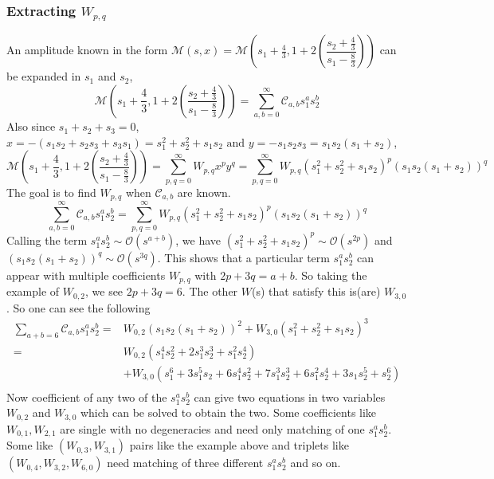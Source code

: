 ﻿\documentclass[12pt,a4paper]{article}
\begin{document}
\subsubsection{Extracting $W_{p,q}$}
An amplitude known in the form $\mathcal{M}(s,x)=\mathcal{M}\left(s_{1}+\frac{4}{3},1+2\left(\dfrac{s_{2}+\frac{4}{3}}{s_{1}-\frac{8}{3}}\right)\right)$ can be expanded in $s_{1}$ and $s_{2}$,
$$
\mathcal{M}\left(s_{1}+\frac{4}{3},1+2\left(\dfrac{s_{2}+\frac{4}{3}}{s_{1}-\frac{8}{3}}\right)\right)=\sum_{a,b=0}^{\infty} \mathcal{C}_{a,b} s_{1}^{a} s_{2}^{b}
$$
Also since $ s_{1} +s_{2} + s_{3}=0$, $x=-\left( s_{1} s_{2} + s_{2} s_{3} + s_{3} s_{1} \right)=s_{1}^{2}+s_{2}^{2}+s_{1}s_{2} \text{ and } y=-s_{1} s_{2}s_{3}=s_{1}s_{2}(s_{1}+s_{2})$, 
$$
\mathcal{M}\left(s_{1}+\frac{4}{3},1+2\left(\dfrac{s_{2}+\frac{4}{3}}{s_{1}-\frac{8}{3}}\right)\right)=\sum_{p,q=0}^{\infty} W_{p, q} x^{p} y^{q}=\sum_{p,q=0}^{\infty} W_{p, q} \left(s_{1}^{2}+s_{2}^{2}+s_{1}s_{2}\right)^{p} \left(s_{1}s_{2}(s_{1}+s_{2}) \right)^{q}
$$
The goal is to find $W_{p, q}$ when $\mathcal{C}_{a,b}$ are known.
$$
\sum_{a,b=0}^{\infty} \mathcal{C}_{a,b} s_{1}^{a} s_{2}^{b}=\sum_{p,q=0}^{\infty} W_{p, q} \left(s_{1}^{2}+s_{2}^{2}+s_{1}s_{2}\right)^{p} \left(s_{1}s_{2}(s_{1}+s_{2}) \right)^{q}
$$
Calling the term $s_{1}^{a}s_{2}^{b}\sim \mathcal{O}(s^{a+b})$, we have $\left(s_{1}^{2}+s_{2}^{2}+s_{1}s_{2}\right)^{p}\sim \mathcal{O}(s^{2p})$ and $ \left(s_{1}s_{2}(s_{1}+s_{2}) \right)^{q} \sim \mathcal{O}(s^{3q})$. This shows that a particular term $s_{1}^{a}s_{2}^{b}$ can appear with multiple coefficients $W_{p, q}$ with $2p+3q=a+b$. So taking the example of $W_{0,2}$, we see $2p+3q=6$. The other $W$(s) that satisfy this is(are) $W_{3,0}$. So one can see the following
$$\begin{aligned}
\sum_{a+b=6} \mathcal{C}_{a,b} s_{1}^{a} s_{2}^{b}=&W_{0, 2}  \left(s_{1}s_{2}(s_{1}+s_{2}) \right)^{2}+W_{3,0} \left(s_{1}^{2}+s_{2}^{2}+s_{1}s_{2}\right)^{3} \\
=&W_{0, 2}  \left(s_{1}^{4} s_{2}^{2}+2 s_{1}^{3} s_{2}^{3}+s_{1}^{2} s_{2}^{4}\right)\\
&+W_{3,0} \left(s_{1}^6 + 3 s_{1}^5 s_{2} + 6 s_{1}^4 s_{2}^2 + 7 s_{1}^3 s_{2}^3 + 6 s_{1}^2 s_{2}^4 +  3 s_{1} s_{2}^5 + s_{2}^6\right) \\
\end{aligned}
$$
Now coefficient of any two of the $s_{1}^{a} s_{2}^{b}$ can give two equations in two variables $W_{0, 2}$ and $W_{3,0}$ which can be solved to obtain the two. Some coefficients like $W_{0, 1} ,W_{2, 1}$ are single with no degeneracies and need only matching of one $s_{1}^{a} s_{2}^{b}$. Some like $\left(W_{0, 3}, W_{3, 1}\right)$ pairs like the example above and triplets like $\left(W_{0, 4}, W_{3, 2}, W_{6, 0}\right)$ need matching of three different $s_{1}^{a} s_{2}^{b}$ and so on.
\end{document}
